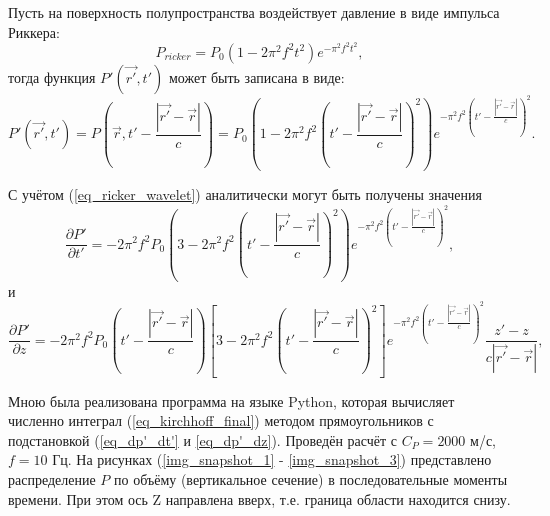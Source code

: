 \documentclass{article}
\begin{document}
Пусть на поверхность полупространства воздействует давление в виде импульса Риккера:
\begin{equation}
\label{eq_ricker_wavelet}
P_{ricker} = P_0(1-2 \pi^2f^2t^2)e^{-\pi^2f^2t^2},
\end{equation}
тогда функция $P'(\vec{r'}, t')$ может быть записана в виде:
\begin{equation}
\label{eq_surface_pressure}
P'(\vec{r'}, t') = P(\vec{r}, t' - \frac{|\vec{r'} - \vec{r}|}{c}) = P_0(1-2 \pi^2f^2(t' - \frac{|\vec{r'} - \vec{r}|}{c})^2)e^{-\pi^2f^2(t'-\frac{|\vec{r'} - \vec{r}|}{c})^2}.
\end{equation}

С учётом (\ref{eq_ricker_wavelet}) аналитически могут быть получены значения
\begin{equation}
\label{eq_dp'_dt'}
\frac{\partial P'}{\partial t'} = -2\pi^2f^2P_0(3-2 \pi^2f^2(t' - \frac{|\vec{r'} - \vec{r}|}{c})^2)e^{-\pi^2f^2(t' - \frac{|\vec{r'} - \vec{r}|}{c})^2},
\end{equation}
и
\begin{equation}
\label{eq_dp'_dz}
\frac{\partial P'}{\partial z} = -2\pi^2f^2P_0(t' - \frac{|\vec{r'} - \vec{r}|}{c})[3-2 \pi^2f^2(t' - \frac{|\vec{r'} - \vec{r}|}{c})^2]e^{-\pi^2f^2(t' - \frac{|\vec{r'} - \vec{r}|}{c})^2}
\frac{z'-z}{c|\vec{r'}-\vec{r}|},
\end{equation}

Мною была реализована программа на языке Python, которая вычисляет численно интеграл (\ref{eq_kirchhoff_final}) методом прямоугольников с подстановкой (\ref{eq_dp'_dt'} и \ref{eq_dp'_dz}).
Проведён расчёт с $C_P = 2000$ м/с, $f = 10$ Гц.
На рисунках (\ref{img_snapshot_1} - \ref{img_snapshot_3}) представлено распределение $P$ по объёму (вертикальное сечение) в последовательные моменты времени.
При этом ось Z направлена вверх, т.е. граница области находится снизу.
\end{document}
